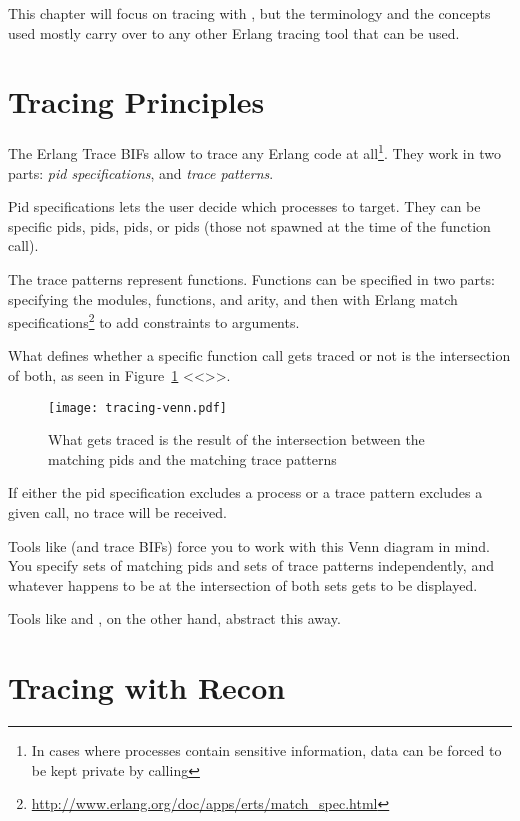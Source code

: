 \documentclass[11pt, oneside]{book}   	%
\newcommand\NamedRef[1]{\ref{#1} <<\nameref{#1}>>}
\begin{document}
This chapter will focus on tracing with , but the terminology and the concepts used mostly carry over to any other Erlang tracing tool that can be used.

\section{Tracing Principles}
\label{sec:tracing-princples}

The Erlang Trace BIFs allow to trace any Erlang code at all\footnote{In cases where processes contain sensitive information, data can be forced to be kept private by calling }. They work in two parts: \emph{pid specifications}, and \emph{trace patterns}.

Pid specifications lets the user decide which processes to target. They can be specific pids,  pids,  pids, or  pids (those not spawned at the time of the function call).

The trace patterns represent functions. Functions can be specified in two parts: specifying the modules, functions, and arity, and then with Erlang match specifications\footnote{\href{http://www.erlang.org/doc/apps/erts/match\_spec.html}{http://www.erlang.org/doc/apps/erts/match\_spec.html}} to add constraints to arguments.

What defines whether a specific function call gets traced or not is the intersection of both, as seen in Figure~\NamedRef{fig:tracing-venn}.

\begin{figure}
  \texttt{[image: tracing-venn.pdf]}%
  \centering%
  \caption{What gets traced is the result of the intersection between the matching pids and the matching trace patterns}%
   \label{fig:tracing-venn}
\end{figure}

If either the pid specification excludes a process or a trace pattern excludes a given call, no trace will be received.

Tools like  (and trace BIFs) force you to work with this Venn diagram in mind. You specify sets of matching pids and sets of trace patterns independently, and whatever happens to be at the intersection of both sets gets to be displayed.

Tools like  and , on the other hand, abstract this away.
\FloatBarrier

\section{Tracing with Recon}
\end{document}
